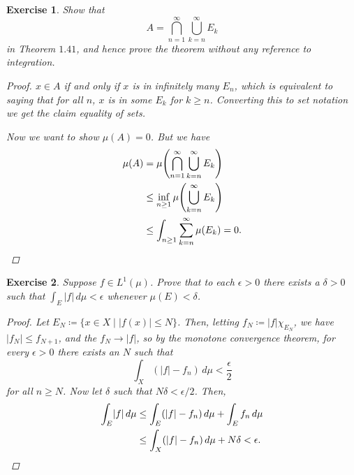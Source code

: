 \documentclass[10pt,letterpaper]{amsart}
\newtheorem{exercise}{Exercise}[section]
\theoremstyle{definition}
\theoremstyle{remark}
\numberwithin{equation}{exercise}
\begin{document}
\begin{multicols}{2}
  \begin{exercise}
    Show that
    \begin{equation*}
      A = \bigcap_{n=1}^\infty \bigcup_{k=n}^\infty E_k
    \end{equation*}
    in Theorem $1.41$, and hence prove the theorem without any reference to
    integration.
    \begin{proof}
      $x \in A$ if and only if $x$ is in infinitely many $E_n$, which is
      equivalent to saying that for all $n$, $x$ is in some $E_k$ for $k \ge n$.
      Converting this to set notation we get the claim equality of sets.
      \par Now we want to show $\mu(A) = 0$. But we have
      \begin{align*}
        \mu(A) &= \mu\!\left( \bigcap_{n=1}^\infty \bigcup_{k=n}^\infty E_k
        \right)\\
        &\le \inf_{n \ge 1} \mu\!\left( \bigcup_{k=n}^\infty E_k \right)\\
      &\le \int_{n \ge 1} \sum_{k=n}^\infty \mu(E_k) = 0.\qedhere
      \end{align*}
    \end{proof}
  \end{exercise}
  \begin{exercise}
    Suppose $f \in L^1(\mu)$. Prove that to each $\epsilon > 0$ there exists a
    $\delta > 0$ such that $\int_E\lvert f \rvert\,d\mu < \epsilon$ whenever
    $\mu(E) < \delta$.
    \begin{proof}
      Let $E_N \coloneqq \{x \in X \mid \lvert f(x) \rvert \le N\}$. Then,
      letting $f_N \coloneqq \lvert f \rvert \chi_{E_N}$, we have
      $\lvert f_{N} \rvert \le f_{N+1}$, and the $f_N \to \lvert f \rvert$,
      so by the monotone convergence
      theorem, for every $\epsilon > 0$ there exists an $N$ such that
      \begin{equation*}
        \int_X (\lvert f \rvert - f_n) \,d\mu < \frac{\epsilon}{2}
      \end{equation*}
      for all $n \ge N$. Now let $\delta$ such that $N\delta < \epsilon/2$.
      Then,
      \begin{align*}
        \int_E \lvert f \rvert\,d\mu &\le \int_E (\lvert f \rvert - f_n)\,d\mu +
        \int_E f_n\,d\mu\\
        &\le \int_X (\lvert f \rvert - f_n)\,d\mu + N\delta < \epsilon.\qedhere
      \end{align*}
    \end{proof}
  \end{exercise}

\end{multicols}
\end{document}
